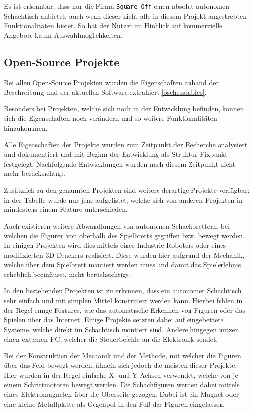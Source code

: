 Es ist erkennbar, dass nur die Firma
\passthrough{\lstinline!Square Off!} einen absolut autonomen Schachtisch
anbietet, auch wenn dieser nicht alle in diesem Projekt angestrebten
Funktionalitäten bietet. So hat der Nutzer im Hinblick auf kommerzielle
Angebote kaum Auswahlmöglichkeiten.

\hypertarget{open-source-projekte}{%
\subsection{Open-Source Projekte}\label{open-source-projekte}}

Bei allen Open-Source Projekten wurden die Eigenschaften anhand der
Beschreibung und der aktuellen Software extrahiert \ref{oschesstables}.

Besonders bei Projekten, welche sich noch in der Entwicklung befinden,
können sich die Eigenschaften noch verändern und so weitere
Funktionalitäten hinzukommen.

Alle Eigenschaften der Projekte wurden zum Zeitpunkt der Recherche
analysiert und dokumentiert und mit Beginn der Entwicklung als
Struktur-Fixpunkt festgelegt. Nachfolgende Entwicklungen wurden nach
diesem Zeitpunkt nicht mehr berücksichtigt.

Zusätzlich zu den genannten Projekten sind weitere derartige Projekte
verfügbar; in der Tabelle wurde nur jene aufgelistet, welche sich von
anderen Projekten in mindestens einem Feature unterschieden.

Auch existieren weitere Abwandlungen von autonomen Schachbrettern, bei
welchen die Figuren von oberhalb des Spielbretts gegriffen bzw. bewegt
werden. In einigen Projekten wird dies mittels eines
Industrie-Roboters\cite{actprojectrobot} oder eines modifizierten
3D-Druckers\cite{atcproject3dprinter} realisiert. Diese wurden hier
aufgrund der Mechanik, welche über dem Spielbrett montiert werden muss
und damit das Spielerlebnis erheblich beeinflusst, nicht berücksichtigt.

In den bestehenden Projekten ist zu erkennen, dass ein autonomer
Schachtisch sehr einfach und mit simplen Mittel konstruiert werden kann.
Hierbei fehlen in der Regel einige Features, wie das automatische
Erkennen von Figuren oder das Spielen über das Internet. Einige Projekte
setzten dabei auf eingebettete Systeme, welche direkt im Schachtisch
montiert sind. Andere hingegen nutzen einen externen PC, welcher die
Steuerbefehle an die Elektronik sendet.

Bei der Konstruktion der Mechanik und der Methode, mit welcher die
Figuren über das Feld bewegt werden, ähneln sich jedoch die meisten
dieser Projekte. Hier wurden in der Regel einfache X- und Y-Achsen
verwendet, welche von je einem Schrittmotoren bewegt werden. Die
Schachfiguren werden dabei mittels eines Elektromagneten über die
Oberseite gezogen. Dabei ist ein Magnet oder eine kleine Metallplatte
als Gegenpol in den Fuß der Figuren eingelassen.

